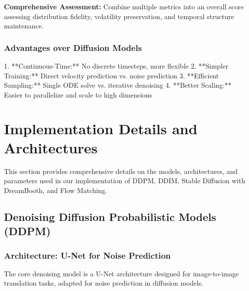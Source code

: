 \documentclass[a4paper,12pt]{article}
\begin{document}
\textbf{Comprehensive Assessment:}
Combine multiple metrics into an overall score assessing distribution fidelity, volatility preservation, and temporal structure maintenance.

\subsubsection{Advantages over Diffusion Models}

1. **Continuous-Time:** No discrete timesteps, more flexible
2. **Simpler Training:** Direct velocity prediction vs. noise prediction
3. **Efficient Sampling:** Single ODE solve vs. iterative denoising
4. **Better Scaling:** Easier to parallelize and scale to high dimensions

\newpage

\section{Implementation Details and Architectures}

This section provides comprehensive details on the models, architectures, and parameters used in our implementation of DDPM, DDIM, Stable Diffusion with DreamBooth, and Flow Matching.

\subsection{Denoising Diffusion Probabilistic Models (DDPM)}

\subsubsection{Architecture: U-Net for Noise Prediction}
The core denoising model is a U-Net architecture designed for image-to-image translation tasks, adapted for noise prediction in diffusion models.
\end{document}
